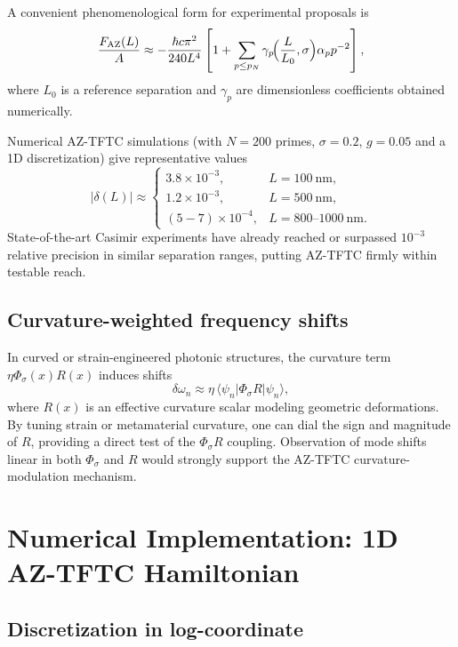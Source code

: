 \documentclass[11pt]{article}
\begin{document}
A convenient phenomenological form for experimental proposals is
\begin{equation}
\frac{F_{\rm AZ}(L)}{A} \approx 
-\frac{\hbar c \pi^2}{240 L^4}
\left[1 + \sum_{p\le p_N}\gamma_p\!\Bigl(\frac{L}{L_0},\sigma\Bigr)\alpha_p p^{-2}\right],
\end{equation}
where $L_0$ is a reference separation and $\gamma_p$ are dimensionless coefficients obtained numerically.

Numerical AZ-TFTC simulations (with $N=200$ primes, $\sigma=0.2$, $g=0.05$ and a 1D discretization) give representative values
\begin{equation}
|\delta(L)| \approx
\begin{cases}
3.8\times 10^{-3}, & L = 100~\text{nm},\\[4pt]
1.2\times 10^{-3}, & L = 500~\text{nm},\\[4pt]
(5-7)\times 10^{-4}, & L=800\text{--}1000~\text{nm}.
\end{cases}
\end{equation}
State-of-the-art Casimir experiments have already reached or surpassed $10^{-3}$ relative precision in similar separation ranges, putting AZ-TFTC firmly within testable reach.\cite{PreciseCasimir,AdvancesCasimir}

\subsection{Curvature-weighted frequency shifts}

In curved or strain-engineered photonic structures, the curvature term $\eta \Phi_\sigma(x) R(x)$ induces shifts
\begin{equation}
\delta\omega_n \approx \eta\,\langle \psi_n | \Phi_\sigma R | \psi_n \rangle,
\end{equation}
where $R(x)$ is an effective curvature scalar modeling geometric deformations.
By tuning strain or metamaterial curvature, one can dial the sign and magnitude of $R$, providing a direct test of the $\Phi_\sigma R$ coupling.
Observation of mode shifts linear in both $\Phi_\sigma$ and $R$ would strongly support the AZ-TFTC curvature-modulation mechanism.

\section{Numerical Implementation: 1D AZ-TFTC Hamiltonian}

\subsection{Discretization in log-coordinate}
\end{document}
